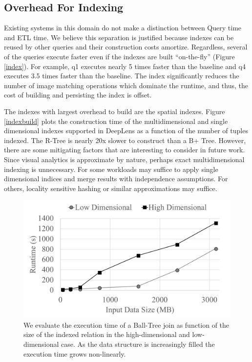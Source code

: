 \subsection{Overhead For Indexing}
Existing systems in this domain do not make a distinction between Query time and ETL time.
We believe this separation is justified because indexes can be reused by other queries and their construction costs amortize.
Regardless, several of the queries execute faster even if the indexes are built ``on-the-fly'' (Figure \ref{index}).
For example, q1 executes nearly 5 times faster than the baseline and q4 executes 3.5 times faster than the baseline.
The index significantly reduces the number of image matching operations which dominate the runtime, and thus, the cost of building and persisting the index is offset.

The indexes with largest overhead to build are the spatial indexes.
Figure \ref{indexbuild} plots the construction time of the multidimensional and single dimensional indexes supported in \textsf{DeepLens} as a function of the number of tuples indexed.
The R-Tree is nearly 20x slower to construct than a B+ Tree.
However, there are some mitigating factors that are interesting to consider in future work.
Since visual analytics is approximate by nature, perhaps exact multidimensional indexing is unnecessary. 
For some workloads may suffice to apply single dimensional indices and merge results with independence assumptions.
For others, locality sensitive hashing or similar approximations may suffice.

\begin{figure}[t]
\centering
 \includegraphics[width=0.8\columnwidth]{figures/spatialjoin.png}
 \caption{We evaluate the execution time of a Ball-Tree join as function of the size of the indexed relation in the high-dimensional and low-dimensional case. As the data structure is increasingly filled the execution time grows non-linearly. \label{join} }
\end{figure}


